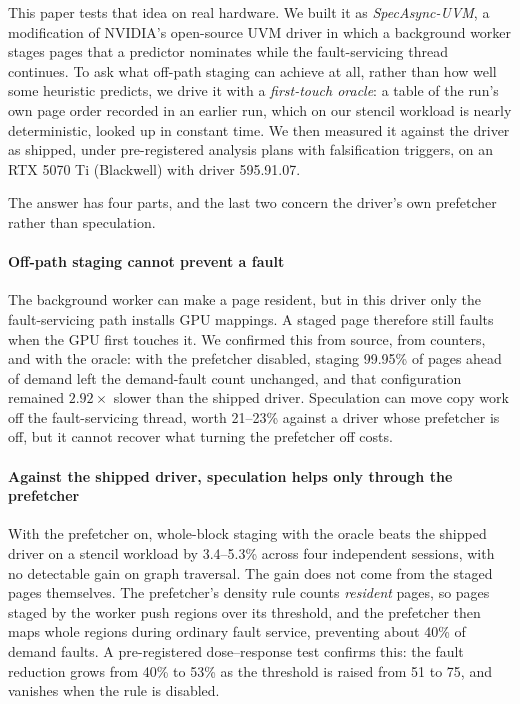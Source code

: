 This paper tests that idea on real hardware. We built it as
\emph{SpecAsync-UVM}, a modification of NVIDIA's open-source UVM driver in which
a background worker stages pages that a predictor nominates while the
fault-servicing thread continues. To ask what off-path staging can achieve at
all, rather than how well some heuristic predicts, we drive it with a
\emph{first-touch oracle}: a table of the run's own page order recorded in an
earlier run, which on our stencil workload is nearly deterministic, looked up in
constant time. We then measured it against the driver as shipped, under
pre-registered analysis plans with falsification triggers, on an RTX 5070 Ti
(Blackwell) with driver 595.91.07.

The answer has four parts, and the last two concern the driver's own
prefetcher rather than speculation.

\paragraph{Off-path staging cannot prevent a fault}
The background worker can make a page resident, but in this driver only the
fault-servicing path installs GPU mappings. A staged page therefore still
faults when the GPU first touches it. We confirmed this from source, from
counters, and with the oracle: with the prefetcher disabled, staging 99.95\% of
pages ahead of demand left the demand-fault count unchanged, and that
configuration remained $2.92\times$ slower than the shipped driver. Speculation
can move copy work off the fault-servicing thread, worth 21--23\% against a
driver whose prefetcher is off, but it cannot recover what turning the
prefetcher off costs.

\paragraph{Against the shipped driver, speculation helps only through the prefetcher}
With the prefetcher on, whole-block staging with the oracle beats the shipped
driver on a stencil workload by 3.4--5.3\% across four independent sessions,
with no detectable gain on graph traversal. The gain does not come from the
staged pages themselves. The prefetcher's density rule counts \emph{resident}
pages, so pages staged by the worker push regions over its threshold, and the
prefetcher then maps whole regions during ordinary fault service, preventing
about 40\% of demand faults. A pre-registered dose--response test confirms
this: the fault reduction grows from 40\% to 53\% as the threshold is raised from
51 to 75, and vanishes when the rule is disabled.


